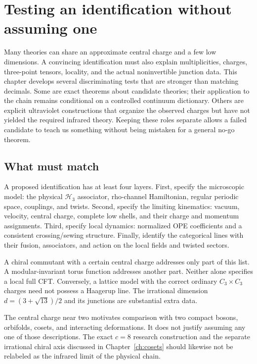 \chapter{Testing an identification without assuming one}
\label{ch:identification}

Many theories can share an approximate central charge and a few low
dimensions. A convincing identification must also explain multiplicities,
charges, three-point tensors, locality, and the actual noninvertible
junction data. This chapter develops several discriminating tests that are
stronger than matching decimals. Some are exact theorems about candidate
theories; their application to the chain remains conditional on a controlled
continuum dictionary. Others are explicit ultraviolet constructions that
organize the observed charges but have not yielded the required infrared
theory. Keeping these roles separate allows a failed candidate to teach us
something without being mistaken for a general no-go theorem.

\section{What must match}

A proposed identification has at least four layers. First, specify the
microscopic model: the physical $\mathcal H_3$ associator, rho-channel Hamiltonian,
regular periodic space, couplings, and twists. Second, specify the limiting
kinematics: vacuum, velocity, central charge, complete low shells, and their
charge and momentum assignments. Third, specify local dynamics: normalized
OPE coefficients and a consistent crossing/sewing structure. Finally,
identify the categorical lines with their fusion, associators, and action
on the local fields and twisted sectors.

A chiral commutant with a certain central charge addresses only part of
this list. A modular-invariant torus function addresses another part.
Neither alone specifies a local full CFT. Conversely, a lattice model with
the correct ordinary $C_3\times C_3$ charges need not possess a Haagerup
line. The irrational dimension $d=(3+\sqrt{13})/2$ and its junctions are
substantial extra data.

The central charge near two motivates comparison with two compact bosons,
orbifolds, cosets, and interacting deformations. It does not justify
assuming any one of those descriptions. The exact $c=8$ research
construction and the separate irrational chiral axis discussed in
Chapter~\ref{ch:cosets} should likewise not be relabeled as the infrared limit of
the physical chain.


